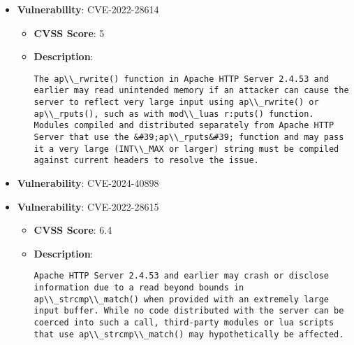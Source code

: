\documentclass{article}
\begin{document}
\begin{itemize}
        \item \textbf{Vulnerability}: CVE-2022-28614
        \begin{itemize}
            \item \textbf{CVSS Score}:  5 
            \item \textbf{Description}:
            \parbox[t]{0.9\linewidth}{
                \verb|The ap\\_rwrite() function in Apache HTTP Server 2.4.53 and earlier may read unintended memory if an attacker can cause the server to reflect very large input using ap\\_rwrite() or ap\\_rputs(), such as with mod\\_luas r:puts() function. Modules compiled and distributed separately from Apache HTTP Server that use the &#39;ap\\_rputs&#39; function and may pass it a very large (INT\\_MAX or larger) string must be compiled against current headers to resolve the issue.|
            }
        \end{itemize}
    
        \item \textbf{Vulnerability}: CVE-2024-40898
    
        \item \textbf{Vulnerability}: CVE-2022-28615
        \begin{itemize}
            \item \textbf{CVSS Score}:  6.4 
            \item \textbf{Description}:
            \parbox[t]{0.9\linewidth}{
                \verb|Apache HTTP Server 2.4.53 and earlier may crash or disclose information due to a read beyond bounds in ap\\_strcmp\\_match() when provided with an extremely large input buffer. While no code distributed with the server can be coerced into such a call, third-party modules or lua scripts that use ap\\_strcmp\\_match() may hypothetically be affected.|
            }
        \end{itemize}
    

\end{itemize}
\end{document}
